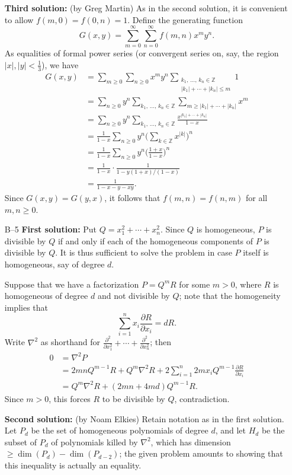 \documentclass[amssymb,twocolumn,pra,10pt,aps]{revtex4-1}
\begin{document}
\begin{itemize}
\def\ZZ{\mathbb{Z}}
\textbf{Third solution:}
(by Greg Martin)
As in the second solution,
it is convenient to allow $f(m,0)=f(0,n)=1$. Define the generating function
\[
G(x,y) = \sum_{m=0}^\infty \sum_{n=0}^\infty f(m,n) x^m y^n.
\]
As equalities of formal power series (or convergent series on,
say, the region $|x|,|y|<\frac13$), we have
\begin{align*}
G(x,y) &= \sum_{m\ge0} \sum_{n\ge0} x^m y^n \sum_{\substack{k_1,\,\dots,\,k_n \in \ZZ \\ |k_1| + \cdots + |k_n| \le m}} 1 \\
&= \sum_{n\ge0} y^n \sum_{k_1,\,\dots,\,k_n \in \ZZ} \sum_{m\ge|k_1| + \cdots + |k_n|} x^m \\
&= \sum_{n\ge0} y^n \sum_{k_1,\,\dots,\,k_n \in \ZZ} \frac{x^{|k_1| + \cdots + |k_n|}}{1-x} \\
&= \frac1{1-x} \sum_{n\ge0} y^n \bigg( \sum_{k\in\ZZ} x^{|k|} \bigg)^n \\
&= \frac1{1-x} \sum_{n\ge0} y^n \bigg( \frac{1+x}{1-x} \bigg)^n \\
&= \frac1{1-x} \cdot \frac1{1-y(1+x)/(1-x)} \\
&= \frac1{1-x-y-xy}.
\end{align*}
Since $G(x,y) = G(y,x)$, it follows that $f(m,n) = f(n,m)$ for all $m,n\ge0$.


\item[B--5]
\textbf{First solution:}
Put $Q = x_1^2 + \cdots + x_n^2$. Since $Q$ is homogeneous, $P$ is divisible
by $Q$ if and only if each of the homogeneous components of $P$ is divisible
by $Q$. It is thus sufficient to solve the problem in case $P$ itself is
homogeneous, say of degree $d$.

Suppose that we have a factorization $P = Q^m R$ for some $m>0$, where
$R$ is homogeneous
of degree $d$ and not divisible by $Q$;
note that the homogeneity implies that
\[
\sum_{i=1}^n x_i \frac{\partial R}{\partial x_i} = dR.
\]
Write $\nabla^2$ as shorthand for $\frac{\partial^2}{\partial
x_1^2} + \cdots + \frac{\partial^2}{\partial x_n^2}$; then
\begin{align*}
0 &= \nabla^2 P \\
&= 2mn Q^{m-1}R + Q^m \nabla^2 R + 2 \sum_{i=1}^n 2mx_i Q^{m-1}
\frac{\partial R}{\partial
x_i} \\
&= Q^m \nabla^2 R + (2mn + 4md) Q^{m-1} R.
\end{align*}
Since $m>0$, this forces $R$ to be divisible by $Q$, contradiction.

\textbf{Second solution:}
(by Noam Elkies)
Retain notation as in the first solution.
Let $P_d$ be the set of homogeneous
polynomials of degree $d$, and let $H_d$ be the subset of $P_d$
of polynomials killed by $\nabla^2$, which has dimension
$\geq \dim(P_d) - \dim(P_{d-2})$; the given problem amounts to showing
that this inequality is actually an equality.


\end{itemize}
\end{document}

